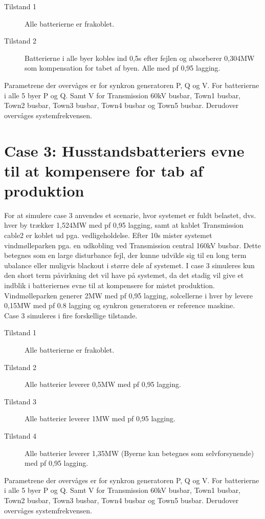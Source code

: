 \begin{description}
	\item[Tilstand 1] Alle batterierne er frakoblet.
	\item[Tilstand 2] Batterierne i alle byer kobles ind 0,5s efter fejlen og absorberer 0,304MW som kompensation for tabet af byen. Alle med pf 0,95 lagging.
\end{description}

Parametrene der overvåges er for synkron generatoren P, Q og V.
For batterierne i alle 5 byer P og Q. Samt V for Transmission 60kV busbar, Town1 busbar, Town2 busbar, Town3 busbar, Town4 busbar og Town5 busbar.
Derudover overvåges systemfrekvensen.

\section{Case 3: Husstandsbatteriers evne til at kompensere for tab af produktion}
For at simulere case 3 anvendes et scenarie, hvor systemet er fuldt belastet, dvs. hver by trækker 1,524MW med pf 0,95 lagging, samt at kablet Transmission cable2 er koblet ud pga. vedligeholdelse. Efter 10s mister systemet vindmølleparken pga. en udkobling ved Transmission central 160kV busbar. Dette betegnes som en large disturbance fejl, der kunne udvikle sig til en long term ubalance eller muligvis blackout i større dele af systemet. I case 3 simuleres kun den short term påvirkning det vil have på systemet, da det stadig vil give et indblik i batteriernes evne til at kompensere for mistet produktion.\\
Vindmølleparken generer 2MW med pf 0,95 lagging, solcellerne i hver by levere 0,15MW med pf 0.8 lagging og synkron generatoren er reference maskine.\\
Case 3 simuleres i fire forskellige tilstande.

\begin{description}
	\item[Tilstand 1] Alle batterierne er frakoblet.
	\item[Tilstand 2] Alle batterier leverer 0,5MW med pf 0,95 lagging.
	\item[Tilstand 3] Alle batterier leverer 1MW med pf 0,95 lagging.
	\item[Tilstand 4] Alle batterier leverer 1,35MW (Byerne kan betegnes som selvforsynende) med pf 0,95 lagging.
\end{description}

Parametrene der overvåges er for synkron generatoren P, Q og V.
For batterierne i alle 5 byer P og Q. Samt V for Transmission 60kV busbar, Town1 busbar, Town2 busbar, Town3 busbar, Town4 busbar og Town5 busbar.
Derudover overvåges systemfrekvensen.

